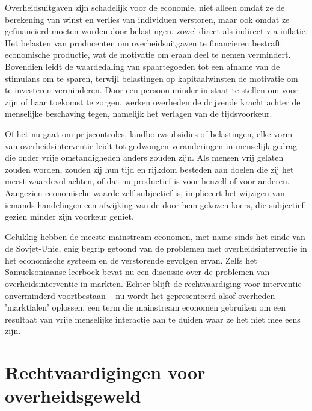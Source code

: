 Overheidsuitgaven zijn schadelijk voor de economie, niet alleen omdat ze de berekening van winst en verlies van individuen verstoren, maar ook omdat ze gefinancierd moeten worden door belastingen, zowel direct als indirect via inflatie. Het belasten van producenten om overheidsuitgaven te financieren bestraft economische productie, wat de motivatie om eraan deel te nemen vermindert. Bovendien leidt de waardedaling van spaartegoeden tot een afname van de stimulans om te sparen, terwijl belastingen op kapitaalwinsten de motivatie om te investeren verminderen. Door een persoon minder in staat te stellen om voor zijn of haar toekomst te zorgen, werken overheden de drijvende kracht achter de menselijke beschaving tegen, namelijk het verlagen van de tijdsvoorkeur.

Of het nu gaat om prijscontroles, landbouwsubsidies of belastingen, elke vorm van overheidsinterventie leidt tot gedwongen veranderingen in menselijk gedrag die onder vrije omstandigheden anders zouden zijn. Als mensen vrij gelaten zouden worden, zouden zij hun tijd en rijkdom besteden aan doelen die zij het meest waardevol achten, of dat nu productief is voor henzelf of voor anderen. Aangezien economische waarde zelf subjectief is, impliceert het wijzigen van iemands handelingen een afwijking van de door hem gekozen koers, die subjectief gezien minder zijn voorkeur geniet.

Gelukkig hebben de meeste mainstream economen, met name sinds het einde van de Sovjet-Unie, enig begrip getoond van de problemen met overheidsinterventie in het economische systeem en de verstorende gevolgen ervan. Zelfs het Samuelsoniaanse leerboek bevat nu een discussie over de problemen van overheidsinterventie in markten. Echter blijft de rechtvaardiging voor interventie onverminderd voortbestaan -- nu wordt het gepresenteerd alsof overheden 'marktfalen' oplossen, een term die mainstream economen gebruiken om een resultaat van vrije menselijke interactie aan te duiden waar ze het niet mee eens zijn.

\hypertarget{rechtvaardigingen-voor-overheidsgeweld}{%
\section{Rechtvaardigingen voor overheidsgeweld}\label{rechtvaardigingen-voor-overheidsgeweld}}

